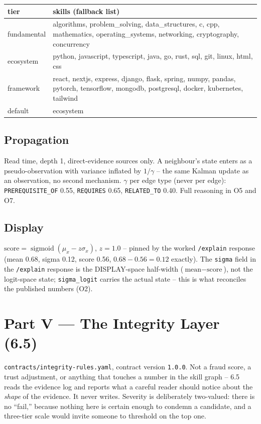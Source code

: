 \documentclass[10pt,a4paper]{article}
\DeclareMathOperator{\sig}{sigmoid}
\begin{document}
\begin{center}\small
\begin{tabular}{@{}lL{10.6cm}@{}}
\toprule tier & skills (fallback list) \\\midrule
fundamental & algorithms, problem\_solving, data\_structures, c, cpp, mathematics, operating\_systems, networking, cryptography, concurrency \\
ecosystem & python, javascript, typescript, java, go, rust, sql, git, linux, html, css \\
framework & react, nextjs, express, django, flask, spring, numpy, pandas, pytorch, tensorflow, mongodb, postgresql, docker, kubernetes, tailwind \\
default & ecosystem \\
\bottomrule
\end{tabular}
\end{center}

\subsection{Propagation}
Read time, depth 1, direct-evidence sources only. A neighbour's state
enters as a pseudo-observation with variance inflated by $1/\gamma$ -- the
same Kalman update as an observation, no second mechanism. $\gamma$ per
edge type (never per edge): \texttt{PREREQUISITE\_OF} 0.55,
\texttt{REQUIRES} 0.65, \texttt{RELATED\_TO} 0.40. Full reasoning in O5 and O7.

\subsection{Display}
$\text{score} = \sig(\mu_x - z\sigma_x)$, $z=1.0$ -- pinned by the worked
\texttt{/explain} response (mean 0.68, sigma 0.12, score 0.56,
$0.68-0.56=0.12$ exactly). The \texttt{sigma} field in the \texttt{/explain}
response is the DISPLAY-space half-width ($\text{mean}-\text{score}$), not
the logit-space state; \texttt{sigma\_logit} carries the actual state --
this is what reconciles the published numbers (O2).

\section{Part V --- The Integrity Layer (6.5)}

\texttt{contracts/integrity-rules.yaml}, contract version \texttt{1.0.0}.
Not a fraud score, a trust adjustment, or anything that touches a number in
the skill graph -- 6.5 reads the evidence log and reports what a careful
reader should notice about the \emph{shape} of the evidence. It never
writes. Severity is deliberately two-valued: there is no ``fail,'' because
nothing here is certain enough to condemn a candidate, and a three-tier
scale would invite someone to threshold on the top one.
\end{document}
